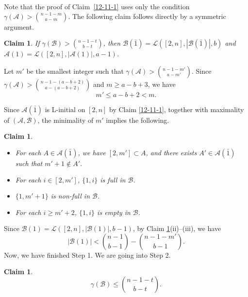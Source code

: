\documentclass[11pt]{article}
\newcommand{\m}{\mathcal}
\newtheorem{claim}[theorem]{Claim}
\begin{document}
Note that the proof of Claim~\ref{12-11-1}
uses only the condition $\gamma(\m A)> {n-1-m\choose a-m}$. 
The following claim follows directly by a symmetric argument.
\begin{claim}\label{gammaB>}
 If $\gamma(\m B)> {n-1-t\choose b-t}$, then 
$\mathcal{B}(\bar{1})=\mathcal{L}([2, n], |\mathcal{B}(\bar{1})|, b)$
and
$\mathcal{A}(1)=\mathcal{L}([2, n], |\mathcal{A}(1)|, a-1)$.
\end{claim}

Let $m'$ be the smallest integer such that $\gamma(\mathcal{A})> {n-1-m' \choose a-m'}$. Since $\gamma(\mathcal{A})> {n-1-(a-b+2)\choose a-(a-b+2)}$ and $m\ge a-b+3$, 
we have 
\begin{equation}\label{m'<m}
    m'\le a-b+2< m.
\end{equation}
 

Since $\mathcal A(\bar1)$ is L-initial on $[2,n]$  by Claim \ref{12-11-1}, together with maximality of $(\m A, \m B)$,  the minimality of $m'$ implies the following.
\begin{claim}\label{abcd}
\begin{itemize}
\item[(i)] For each $A\in \mathcal{A}(\bar{1})$, we have $[2, m']\subset A$, and there exists $A'\in \mathcal{A}(\bar{1})$ such that $m'+1\not\in A'$.
\item[(ii)] For each $i \in [2, m']$, $\{1, i\}$ is full in $\mathcal{B}$.
\item[(iii)] $\{1, m'+1\}$ is non-full in $\mathcal{B}$.
\item[(iv)] For each $i\ge m'+2$, $\{1, i\}$ is empty in $\mathcal{B}$. 
\end{itemize}
\end{claim}


Since $\mathcal{B}(1)=\mathcal{L}([2, n], |\mathcal{B}(1)|, b-1)$, 
 by Claim \ref{abcd}(ii)--(iii),  we have
 \begin{equation}\label{12-12-2}
|\mathcal{B}(1)|< {n-1\choose b-1}-{n-1-m' \choose b-1}.
\end{equation}
Now, we have finished Step 1. We are going into Step 2.   

\begin{claim}
\begin{equation}\label{gammaB<}
\gamma(\m B)\le {n-1-t\choose b-t}. 
\end{equation}
\end{claim}
\end{document}
